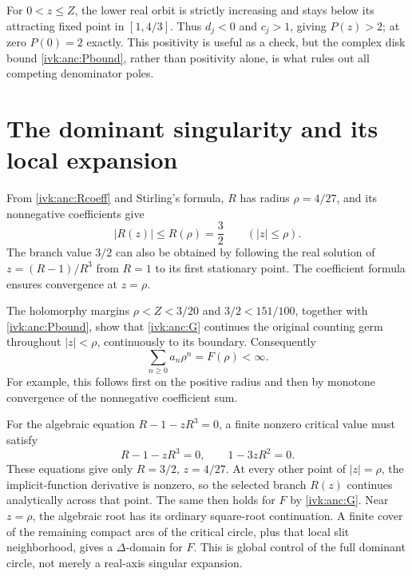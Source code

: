 \documentclass[11pt,letterpaper]{article}
\theoremstyle{remark}\newtheorem{remark}[theorem]{Remark}
\begin{document}
For $0<z\le Z$, the lower real orbit is strictly increasing and
stays below its attracting fixed point in $[1,4/3]$. Thus $d_j<0$
and $c_j>1$, giving $P(z)>2$; at zero $P(0)=2$ exactly. This
positivity is useful as a check, but the complex disk bound
\eqref{ivk:anc:Pbound}, rather than positivity alone, is what rules out
all competing denominator poles.

\section{The dominant singularity and its local expansion}\label{ivk:anc:sec:sing}
From \eqref{ivk:anc:Rcoeff} and Stirling's formula, $R$ has radius
$\rho=4/27$, and its nonnegative coefficients give
\begin{equation}\label{ivk:anc:Rbound}
 |R(z)|\le R(\rho)=\frac32\qquad(|z|\le\rho).
\end{equation}
The branch value $3/2$ can also be obtained by following the real
solution of $z=(R-1)/R^3$ from $R=1$ to its first stationary point.
The coefficient formula ensures convergence at $z=\rho$.

The holomorphy margins $\rho<Z<3/20$ and $3/2<151/100$, together
with \eqref{ivk:anc:Pbound}, show that \eqref{ivk:anc:G} continues the original
counting germ throughout $|z|<\rho$, continuously to its boundary.
Consequently
\begin{equation}\label{ivk:anc:boundarysum}
 \sum_{n\ge0}a_n\rho^n=F(\rho)<\infty.
\end{equation}
For example, this follows first on the positive radius and then by
monotone convergence of the nonnegative coefficient sum.

For the algebraic equation $R-1-zR^3=0$, a finite nonzero critical
value must satisfy
\[
 R-1-zR^3=0,\qquad 1-3zR^2=0.
\]
These equations give only $R=3/2$, $z=4/27$. At every other point
of $|z|=\rho$, the implicit-function derivative is nonzero, so the
selected branch $R(z)$ continues analytically across that point.
The same then holds for $F$ by \eqref{ivk:anc:G}. Near $z=\rho$, the
algebraic root has its ordinary square-root continuation. A finite
cover of the remaining compact arcs of the critical circle, plus
that local slit neighborhood, gives a $\Delta$-domain for $F$.
This is global control of the full dominant circle, not merely a
real-axis singular expansion.
\end{document}
